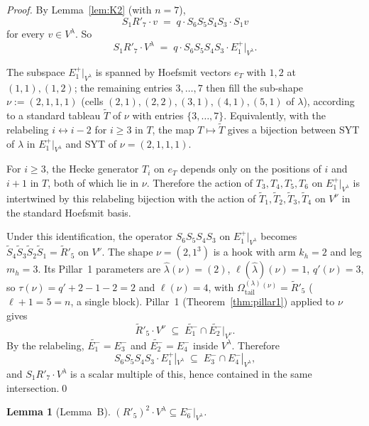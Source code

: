 \documentclass[11pt]{article}
\newtheorem{lemma}[theorem]{Lemma}
\theoremstyle{definition}
\newcommand{\Vlam}{V^\lambda}
\newcommand{\Omtail}{\Omega^{(\lambda)}_{\mathrm{tail}}}
\newcommand{\hatl}{\widehat\lambda}
\newcommand{\elh}{\ell(\hatl)}
\newcommand{\Rp}{R'}
\newcommand{\Eplus}[1]{E^+_{#1}}
\newcommand{\Eminus}[1]{E^-_{#1}}
\begin{document}
\begin{proof}
By Lemma~\ref{lem:K2} (with $n = 7$),
\[
   S_1 \Rp_7 \cdot v \;=\; q \cdot S_6 S_5 S_4 S_3 \cdot S_1 v
\]
for every $v \in \Vlam$. So
\[
   S_1 \Rp_7 \cdot \Vlam \;=\; q \cdot S_6 S_5 S_4 S_3 \cdot \Eplus 1|_{\Vlam}.
\]

The subspace $\Eplus 1|_{\Vlam}$ is spanned by Hoefsmit vectors $e_T$ with $1, 2$
at $(1,1), (1,2)$; the remaining entries $3,\ldots,7$ then fill the sub-shape
$\nu := (2,1,1,1)$ (cells $(2,1), (2,2), (3,1), (4,1), (5,1)$ of $\lambda$),
according to a standard tableau $\widetilde T$ of $\nu$ with entries $\{3,\ldots,7\}$.
Equivalently, with the relabeling $i \leftrightarrow i - 2$ for $i \ge 3$ in $T$,
the map $T \mapsto \widetilde T$ gives a bijection between SYT of $\lambda$ in
$\Eplus 1|_{\Vlam}$ and SYT of $\nu = (2,1,1,1)$.

For $i \ge 3$, the Hecke generator $T_i$ on $e_T$ depends only on the positions of
$i$ and $i+1$ in $T$, both of which lie in $\nu$. Therefore the action of
$T_3, T_4, T_5, T_6$ on $\Eplus 1|_{\Vlam}$ is intertwined by this relabeling
bijection with the action of $\widetilde T_1, \widetilde T_2, \widetilde T_3,
\widetilde T_4$ on $V^\nu$ in the standard Hoefsmit basis.

Under this identification, the operator $S_6 S_5 S_4 S_3$ on $\Eplus 1|_{\Vlam}$
becomes $\widetilde S_4 \widetilde S_3 \widetilde S_2 \widetilde S_1 = \widetilde \Rp_5$
on $V^\nu$. The shape $\nu = (2,1^3)$ is a hook with arm $k_h = 2$ and leg
$m_h = 3$. Its Pillar~1 parameters are
$\hatl(\nu) = (2)$, $\elh(\nu) = 1$, $q'(\nu) = 3$, so
$\tau(\nu) = q' + 2 - 1 - 2 = 2$ and $\ell(\nu) = 4$, with $\Omtail^{(\nu)} = \widetilde \Rp_5$
($\ell + 1 = 5 = n$, a single block).
Pillar~1 (Theorem~\ref{thm:pillar1}) applied to $\nu$ gives
\[
   \widetilde \Rp_5 \cdot V^\nu \;\subseteq\; \widetilde{\Eminus 1} \cap \widetilde{\Eminus 2}|_{V^\nu}.
\]
By the relabeling, $\widetilde{\Eminus 1} = \Eminus 3$ and $\widetilde{\Eminus 2} = \Eminus 4$
inside $\Vlam$. Therefore
\[
   S_6 S_5 S_4 S_3 \cdot \Eplus 1|_{\Vlam}
   \;\subseteq\; \Eminus 3 \cap \Eminus 4|_{\Vlam},
\]
and $S_1 \Rp_7 \cdot \Vlam$ is a scalar multiple of this, hence contained in the
same intersection.\qed
\end{proof}

\begin{lemma}[Lemma~B]\label{lem:B}
$(\Rp_5)^2 \cdot \Vlam \subseteq \Eminus 6|_{\Vlam}$.
\end{lemma}
\end{document}
